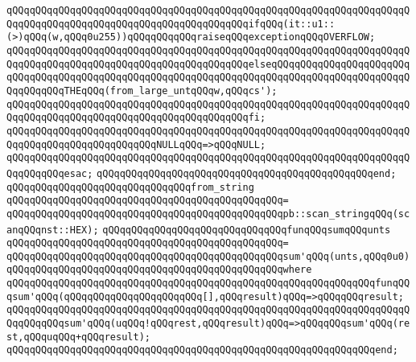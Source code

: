 \verb|qQQqqQQqqQQqqQQqqQQqqQQqqQQqqQQqqQQqqQQqqQQqqQQqqQQqqQQqqQQqqQQqqQQqqQQqqQQqqQQqqQQqqQQqqQQqqQQqqQQqqQQqqQQqqQQqifqQQq(it::u1::(>)qQQq(w,qQQq0u255))qQQqqQQqqQQqraiseqQQqexceptionqQQqOVERFLOW;|\newline
\verb|qQQqqQQqqQQqqQQqqQQqqQQqqQQqqQQqqQQqqQQqqQQqqQQqqQQqqQQqqQQqqQQqqQQqqQQqqQQqqQQqqQQqqQQqqQQqqQQqqQQqqQQqqQQqqQQqelseqQQqqQQqqQQqqQQqqQQqqQQqqQQqqQQqqQQqqQQqqQQqqQQqqQQqqQQqqQQqqQQqqQQqqQQqqQQqqQQqqQQqqQQqqQQqqQQqqQQqqQQqTHEqQQq(from_large_untqQQqw,qQQqcs');|\newline
\verb|qQQqqQQqqQQqqQQqqQQqqQQqqQQqqQQqqQQqqQQqqQQqqQQqqQQqqQQqqQQqqQQqqQQqqQQqqQQqqQQqqQQqqQQqqQQqqQQqqQQqqQQqqQQqqQQqfi;|\newline
\newline
\verb|qQQqqQQqqQQqqQQqqQQqqQQqqQQqqQQqqQQqqQQqqQQqqQQqqQQqqQQqqQQqqQQqqQQqqQQqqQQqqQQqqQQqqQQqqQQqqQQqNULLqQQq=>qQQqNULL;|\newline
\verb|qQQqqQQqqQQqqQQqqQQqqQQqqQQqqQQqqQQqqQQqqQQqqQQqqQQqqQQqqQQqqQQqqQQqqQQqqQQqqQQqesac;|\newline
\verb|qQQqqQQqqQQqqQQqqQQqqQQqqQQqqQQqqQQqqQQqqQQqqQQqend;|\newline
\newline
\verb|qQQqqQQqqQQqqQQqqQQqqQQqqQQqqQQqfrom_string|\newline
\verb|qQQqqQQqqQQqqQQqqQQqqQQqqQQqqQQqqQQqqQQqqQQqqQQq=|\newline
\verb|qQQqqQQqqQQqqQQqqQQqqQQqqQQqqQQqqQQqqQQqqQQqqQQqpb::scan_stringqQQq(scanqQQqnst::HEX);|\newline
\newline
\verb|qQQqqQQqqQQqqQQqqQQqqQQqqQQqqQQqfunqQQqsumqQQqunts|\newline
\verb|qQQqqQQqqQQqqQQqqQQqqQQqqQQqqQQqqQQqqQQqqQQqqQQq=|\newline
\verb|qQQqqQQqqQQqqQQqqQQqqQQqqQQqqQQqqQQqqQQqqQQqqQQqsum'qQQq(unts,qQQq0u0)|\newline
\verb|qQQqqQQqqQQqqQQqqQQqqQQqqQQqqQQqqQQqqQQqqQQqqQQqwhere|\newline
\verb|qQQqqQQqqQQqqQQqqQQqqQQqqQQqqQQqqQQqqQQqqQQqqQQqqQQqqQQqqQQqqQQqfunqQQqsum'qQQq(qQQqqQQqqQQqqQQqqQQqqQQq[],qQQqresult)qQQq=>qQQqqQQqresult;|\newline
\verb|qQQqqQQqqQQqqQQqqQQqqQQqqQQqqQQqqQQqqQQqqQQqqQQqqQQqqQQqqQQqqQQqqQQqqQQqqQQqqQQqsum'qQQq(uqQQq!qQQqrest,qQQqresult)qQQq=>qQQqqQQqsum'qQQq(rest,qQQquqQQq+qQQqresult);|\newline
\verb|qQQqqQQqqQQqqQQqqQQqqQQqqQQqqQQqqQQqqQQqqQQqqQQqqQQqqQQqqQQqqQQqend;|\newline
